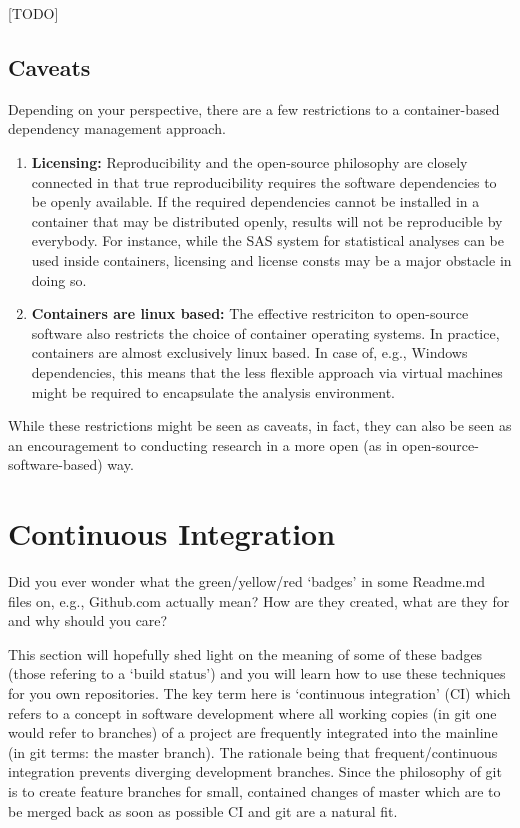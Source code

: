 \documentclass[]{book}
\providecommand{\tightlist}{%
  \setlength{\itemsep}{0pt}\setlength{\parskip}{0pt}}
\begin{document}
{[}TODO{]}

\section{Caveats}\label{caveats}

Depending on your perspective, there are a few restrictions to a
container-based dependency management approach.

\begin{enumerate}
\def\labelenumi{\arabic{enumi}.}
\tightlist
\item
  \textbf{Licensing:} Reproducibility and the open-source philosophy are
  closely connected in that true reproducibility requires the software
  dependencies to be openly available. If the required dependencies
  cannot be installed in a container that may be distributed openly,
  results will not be reproducible by everybody. For instance, while the
  SAS system for statistical analyses can be used inside containers,
  licensing and license consts may be a major obstacle in doing so.
\item
  \textbf{Containers are linux based:} The effective restriciton to
  open-source software also restricts the choice of container operating
  systems. In practice, containers are almost exclusively linux based.
  In case of, e.g., Windows dependencies, this means that the less
  flexible approach via virtual machines might be required to
  encapsulate the analysis environment.
\end{enumerate}

While these restrictions might be seen as caveats, in fact, they can
also be seen as an encouragement to conducting research in a more open
(as in open-source-software-based) way.

\chapter{Continuous Integration}\label{chptr-continuous-integration}

Did you ever wonder what the green/yellow/red `badges' in some Readme.md
files on, e.g., Github.com actually mean? How are they created, what are
they for and why should you care?

This section will hopefully shed light on the meaning of some of these
badges (those refering to a `build status') and you will learn how to
use these techniques for you own repositories. The key term here is
`continuous integration' (CI) which refers to a concept in software
development where all working copies (in git one would refer to
branches) of a project are frequently integrated into the mainline (in
git terms: the master branch). The rationale being that
frequent/continuous integration prevents diverging development branches.
Since the philosophy of git is to create feature branches for small,
contained changes of master which are to be merged back as soon as
possible CI and git are a natural fit.
\end{document}
